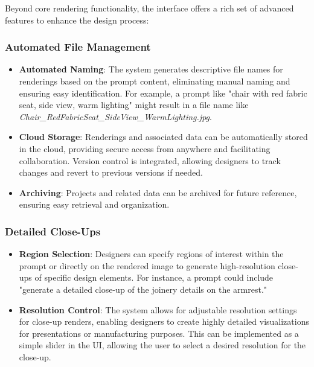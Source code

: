 \documentclass{article}
\begin{document}
Beyond core rendering functionality, the interface offers a rich set of advanced features to enhance the design process:

\subsubsection{Automated File Management}
\begin{itemize}
\item \textbf{Automated Naming}: The system generates descriptive file names for renderings based on the prompt content, eliminating manual naming and ensuring easy identification. For example, a prompt like "chair with red fabric seat, side view, warm lighting" might result in a file name like \textit{Chair\_RedFabricSeat\_SideView\_WarmLighting.jpg}.
\item \textbf{Cloud Storage}: Renderings and associated data can be automatically stored in the cloud, providing secure access from anywhere and facilitating collaboration. Version control is integrated, allowing designers to track changes and revert to previous versions if needed.
\item \textbf{Archiving}: Projects and related data can be archived for future reference, ensuring easy retrieval and organization.
\end{itemize}

\subsubsection{Detailed Close-Ups}
\begin{itemize}
\item \textbf{Region Selection}: Designers can specify regions of interest within the prompt or directly on the rendered image to generate high-resolution close-ups of specific design elements. For instance, a prompt could include "generate a detailed close-up of the joinery details on the armrest."
\item \textbf{Resolution Control}: The system allows for adjustable resolution settings for close-up renders, enabling designers to create highly detailed visualizations for presentations or manufacturing purposes. This can be implemented as a simple slider in the UI, allowing the user to select a desired resolution for the close-up.
\end{itemize}
\end{document}
